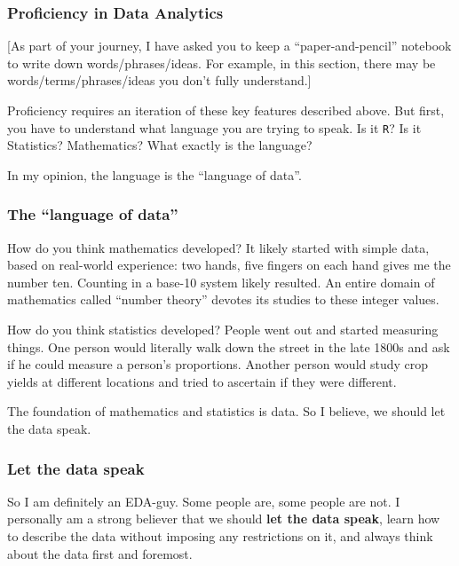 \documentclass[
]{article}
\begin{document}
\hypertarget{proficiency-in-data-analytics}{%
\subsubsection{Proficiency in Data
Analytics}\label{proficiency-in-data-analytics}}

{[}As part of your journey, I have asked you to keep a
``paper-and-pencil'' notebook to write down words/phrases/ideas. For
example, in this section, there may be words/terms/phrases/ideas you
don't fully understand.{]}

Proficiency requires an iteration of these key features described above.
But first, you have to understand what language you are trying to speak.
Is it \texttt{R}? Is it Statistics? Mathematics? What exactly is the
language?

In my opinion, the language is the ``language of data''.

\hypertarget{the-language-of-data}{%
\subsubsection{The ``language of data''}\label{the-language-of-data}}

How do you think mathematics developed? It likely started with simple
data, based on real-world experience: two hands, five fingers on each
hand gives me the number ten. Counting in a base-10 system likely
resulted. An entire domain of mathematics called ``number theory''
devotes its studies to these integer values.

How do you think statistics developed? People went out and started
measuring things. One person would literally walk down the street in the
late 1800s and ask if he could measure a person's proportions. Another
person would study crop yields at different locations and tried to
ascertain if they were different.

The foundation of mathematics and statistics is data. So I believe, we
should let the data speak.

\hypertarget{let-the-data-speak}{%
\subsubsection{Let the data speak}\label{let-the-data-speak}}

So I am definitely an EDA-guy. Some people are, some people are not. I
personally am a strong believer that we should \textbf{let the data
speak}, learn how to describe the data without imposing any restrictions
on it, and always think about the data first and foremost.
\end{document}

